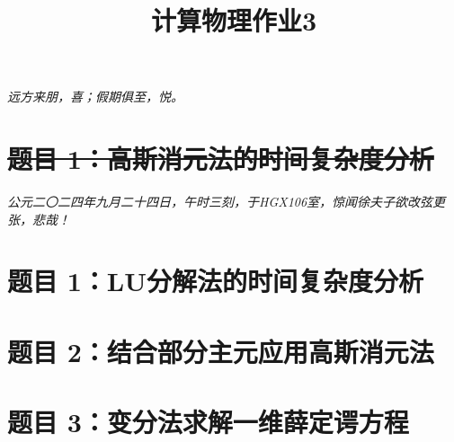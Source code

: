 \documentclass[11pt]{article}
\author{
}
\title{计算物理作业3}
\begin{document}
\maketitle

\textit{远方来朋，喜；假期俱至，悦。}


\section{\texorpdfstring{\sout{题目 1：高斯消元法的时间复杂度分析}}{题目 1：高斯消元法的时间复杂度分析}}\label{sec:gaussian_elimination}


\setcounter{section}{0}
\vspace{1em}
\textit{公元二〇二四年九月二十四日，午时三刻，于HGX106室，惊闻徐夫子欲改弦更张，悲哉！}
\vspace{-1em}
\section{\texorpdfstring{题目 1：$\bm{LU}$分解法的时间复杂度分析}{题目 1：LU分解法的时间复杂度分析}}


\section{题目 2：结合部分主元应用高斯消元法}


\section{题目 3：变分法求解一维薛定谔方程}

\end{document}
